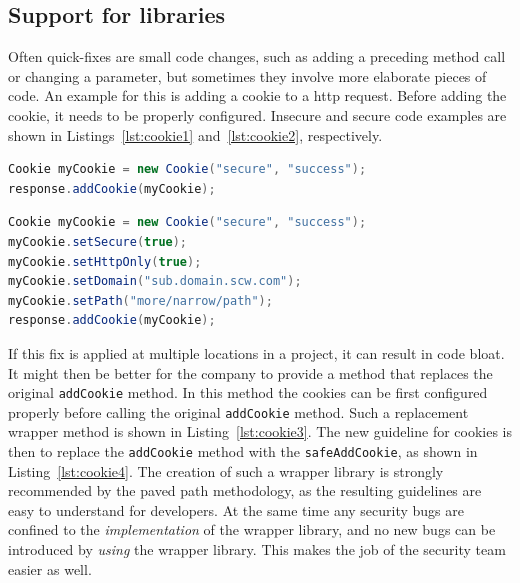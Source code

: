 \subsection{Support for libraries}
Often quick-fixes are small code changes, such as adding a preceding method call or changing a parameter, but sometimes they involve more elaborate pieces of code.
An example for this is adding a cookie to a \gls{http} request.
Before adding the cookie, it needs to be properly configured.
Insecure and secure code examples are shown in Listings~\ref{lst:cookie1} and~\ref{lst:cookie2}, respectively.

\begin{lstlisting}[float,language={Java},caption={This cookie is not configured before it is added to the response, as a result this code fragment is insecure.}, float,label={lst:cookie1},abovecaptionskip=-0.0pt]
Cookie myCookie = new Cookie("secure", "success");
response.addCookie(myCookie);
\end{lstlisting}

\begin{lstlisting}[language={Java},caption={Several configuration options are added to narrow the scope that the cookie can be used, and to ensure it is not sent over plaintext.}, float,label={lst:cookie2},abovecaptionskip=-0.0pt]
Cookie myCookie = new Cookie("secure", "success");
myCookie.setSecure(true);
myCookie.setHttpOnly(true);
myCookie.setDomain("sub.domain.scw.com");
myCookie.setPath("more/narrow/path");
response.addCookie(myCookie);
\end{lstlisting}

If this fix is applied at multiple locations in a project, it can result in code bloat.
It might then be better for the company to provide a method that replaces the original \texttt{addCookie} method.
In this method the cookies can be first configured properly before calling the original \texttt{addCookie} method.
Such a replacement wrapper method is shown in Listing~\ref{lst:cookie3}.
The new guideline for cookies is then to replace the \texttt{addCookie} method with the \texttt{safeAddCookie}, as shown in Listing~\ref{lst:cookie4}.
The creation of such a wrapper library is strongly recommended by the paved path methodology, as the resulting guidelines are easy to understand for developers.
At the same time any security bugs are confined to the \textit{implementation} of the wrapper library, and no new bugs can be introduced by \textit{using} the wrapper library. This makes the job of the security team easier as well.

